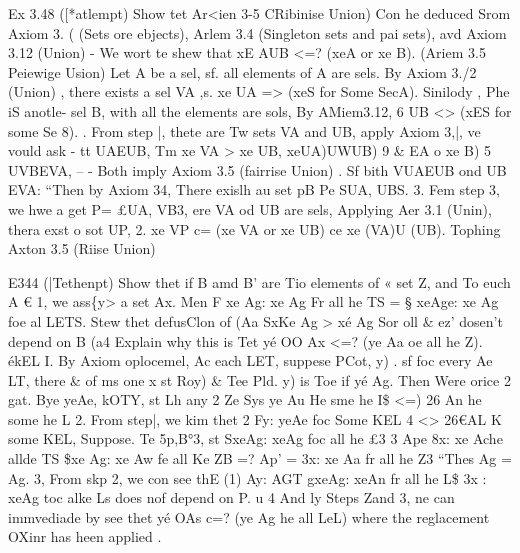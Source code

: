 \documentclass[a4paper,12pt]{article}
\begin{document}
\vspace{10pt}

\par

\vspace{10pt}

    Ex 3.48 ([*atlempt)   Show tet Ar<ien 3-5 CRibinise Union) Con he deduced   Srom Axiom 3. ( (Sets ore ebjects), Arlem 3.4 (Singleton sets and pai sets),  avd Axiom 3.12 (Union) -   We wort te shew that xE AUB <=? (xeA or xe B). (Ariem 3.5 Peiewige Usion)    Let A be a sel, sf. all elements of A are sels.  By Axiom 3./2 (Union) , there exists a sel VA ,s.  xe UA => (xeS for Some SecA).    Sinilody , Phe iS anotle- sel B, with all the elements are sols,  By AMiem3.12, 6 UB <> (xES for some Se 8).    . From step |, thete are Tw sets VA and UB, apply Axiom 3,|, ve vould ask -   tt UAEUB, Tm xe VA > xe UB, xeUA)UWUB) 9 \& EA o xe B)  5 UVBEVA, -- - Both imply Axiom 3.5 (fairrise Union) .   Sf bith VUAEUB ond UB EVA:   “Then by Axiom 34, There exislh au set pB Pe SUA, UBS.    3. Fem step 3, we hwe a get P= £UA, VB3, ere VA od UB are sels,  Applying Aer 3.1 (Unin), thera exst o sot UP, 2.  xe VP c= (xe VA or xe UB) ce xe (VA)U (UB).  Tophing Axton 3.5 (Riise Union) 

\vspace{10pt}

\par

\vspace{10pt}

    E344 (|Tethenpt)  Show thet if B amd B’ are Tio elements of « set Z,  and To euch A € 1, we ass\{y> a set Ax. Men    F xe Ag: xe Ag Fr all he TS = § xeAge: xe Ag foe al LETS.  Stew thet defusClon of (Aa SxKe Ag > xé Ag Sor oll \& ez’ dosen't depend on B  (a4    Explain why this is Tet yé OO Ax <=? (ye Aa oe all he Z).  ékEL    I. By Axiom oplocemel, Ac each LET, suppese PCot, y) . sf  foc every Ae LT, there \& of ms one x st Roy) \& Tee  Pld. y) is Toe if yé Ag.  Then Were orice 2 gat. Bye yeAe, kOTY, st Lh any 2    Ze Sys ye Au He sme he I\$ <=) 26 An he some he L    2. From step|, we kim thet 2 Fy: yeAe foc Some KEL 4  <> 26€AL K some KEL,    Suppose. Te 5p,B°3, st SxeAg: xeAg foc all he £3  3 Ape 8x: xe Ache allde TS    \$xe Ag: xe Aw fe all Ke ZB  =? Ap’ = 3x: xe Aa fr all he Z3  “Thes Ag = Ag.  3, From skp 2, we con see thE (1) Ay:    AGT    gxeAg: xeAn fr all he L\$  3x : xeAg toc alke Ls does nof depend  on P.    u    4 And ly Steps Zand 3, ne can immvediade by see thet  yé OAs c=? (ye Ag he all LeL)    where the reglacement OXinr has heen applied . 
\end{document}
